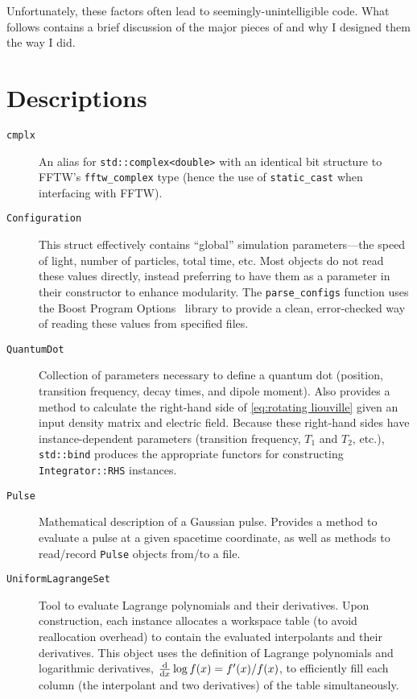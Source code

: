 Unfortunately, these factors often lead to seemingly-unintelligible code. What follows contains a brief discussion of the major pieces of \QuEST{} and why I designed them the way I did.

\section{\label{sec:quest descriptions}Descriptions}

\begin{description}
  \item[\texttt{cmplx}] An alias for \lstinline!std::complex<double>! with an identical bit structure to FFTW's \lstinline!fftw_complex! type (hence the use of \lstinline!static_cast! when interfacing with FFTW).
  \item[\texttt{Configuration}] This struct effectively contains ``global'' simulation parameters---the speed of light, number of particles, total time, etc.
    Most objects do not read these values directly, instead preferring to have them as a parameter in their constructor to enhance modularity. 
    The \lstinline!parse_configs! function uses the Boost Program Options~\cite{boost} library to provide a clean, error-checked way of reading these values from specified files.
  \item[\texttt{QuantumDot}] Collection of parameters necessary to define a quantum dot (position, transition frequency, decay times, and dipole moment).
    Also provides a method to calculate the right-hand side of \cref{eq:rotating liouville} given an input density matrix and electric field.
    Because these right-hand sides have instance-dependent parameters (transition frequency, $T_1$ and $T_2$, etc.), \lstinline!std::bind! produces the appropriate functors for constructing \lstinline!Integrator::RHS! instances.
  \item[\texttt{Pulse}] Mathematical description of a Gaussian pulse.
    Provides a method to evaluate a pulse at a given spacetime coordinate, as well as methods to read/record \lstinline!Pulse! objects from/to a file.
  \item[\texttt{UniformLagrangeSet}] Tool to evaluate Lagrange polynomials and their derivatives.
    Upon construction, each instance allocates a workspace table (to avoid reallocation overhead) to contain the evaluated interpolants and their derivatives.
    This object uses the definition of Lagrange polynomials and logarithmic derivatives, $\dv{x} \log f(x) = f'(x)/f(x)$, to efficiently fill each column (the interpolant and two derivatives) of the table simultaneously.

\end{description}
